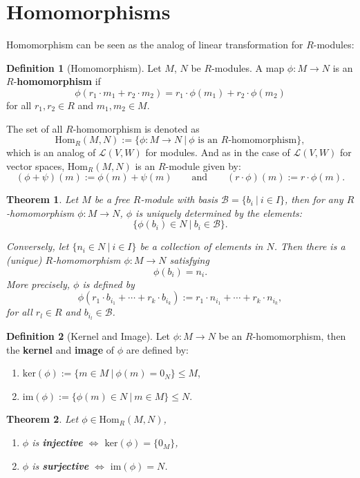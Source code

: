 \documentclass[11pt,openany]{book}
\theoremstyle{plain}
\newtheorem{theorem}{Theorem}[chapter]
\theoremstyle{definition}
\newtheorem{definition}[definition]{Definition}
\theoremstyle{remark}
\begin{document}
\section{Homomorphisms} 
Homomorphism can be seen as the analog of linear transformation for $R$-modules:

\begin{definition} [Homomorphism]
    Let $M$, $N$ be $R$-modules. A map $\phi:M\to N$ is an $R$-{\bf homomorphism} if
    $$\phi(r_1\cdot m_1+r_2\cdot m_2)=r_1\cdot\phi(m_1)+r_2\cdot\phi(m_2)$$
    for all $r_1,r_2\in R$ and $m_1,m_2\in M$.

    The set of all $R$-homomorphism is denoted as 
    $$\mathrm{Hom}_{R}(M,N):=\{\phi:M\to N\ |\ \phi\text{ is an }R\text{-homomorphism}\},$$
    which is an analog of $\mathcal{L}(V,W)$ for modules. And as in the case of $\mathcal{L}(V,W)$ for vector spaces, $\mathrm{Hom}_{R}(M,N)$ is an $R$-module given by:
    $$(\phi+\psi)(m):=\phi(m)+\psi(m)\quad\quad\text{and}\quad\quad(r\cdot\phi)(m):=r\cdot\phi(m).$$
\end{definition}

\begin{theorem}
    Let $M$ be a free $R$-module with basis $\mathcal{B}=\{b_i\ |\ i\in I\}$, then for any $R$-homomorphism $\phi:M\to N$, $\phi$ is uniquely determined by the elements:
    $$\{\phi(b_i)\in N\ |\ b_i\in \mathcal{B}\}.$$

    Conversely, let $\{n_i\in N\ |\ i\in I\}$ be a collection of elements in $N$. Then there is a (unique) $R$-homomorphism $\phi:M\to N$ satisfying
    $$\phi(b_i)=n_i.$$
    More precisely, $\phi$ is defined by
    $$\phi(r_1\cdot b_{i_1}+\cdots+r_k\cdot b_{i_k}):=r_1\cdot n_{i_1}+\cdots+r_k\cdot n_{i_k},$$
    for all $r_l\in R$ and $b_{i_l}\in\mathcal{B}$.
\end{theorem}

\begin{definition} [Kernel and Image]
    Let $\phi:M\to N$ be an $R$-homomorphism, then the {\bf kernel} and {\bf image} of $\phi$ are defined by:
    \begin{enumerate}
        \item $\mathrm{ker}(\phi):=\{m\in M\ |\ \phi(m)=0_N\}\leq M$,
        \item $\mathrm{im}(\phi):=\{\phi(m)\in N\ |\ m\in M\}\leq N$.
    \end{enumerate}
\end{definition}

\begin{theorem}
    Let $\phi\in\mathrm{Hom}_{R}(M,N)$,
    \begin{enumerate}
        \item $\phi$ is {\bf injective}  $\Leftrightarrow$  $\mathrm{ker}(\phi)=\{0_M\}$,
        \item $\phi$ is {\bf surjective}  $\Leftrightarrow$  $\mathrm{im}(\phi)=N$.
    \end{enumerate}
\end{theorem}
\end{document}
